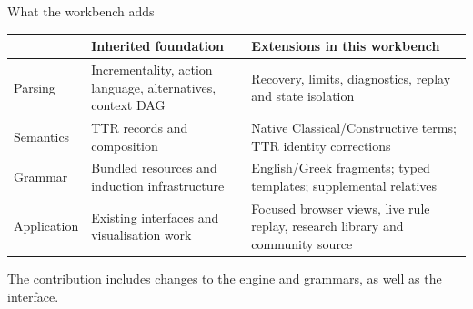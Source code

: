 \documentclass[aspectratio=169,11pt]{beamer}
\newcommand{\aside}[1]{\par{\small\color{Muted}#1}\par}
\begin{document}
\begin{frame}{What the workbench adds}
  \color{Ink}
  \small
  \begin{tabularx}{\textwidth}{@{}p{28mm}YY@{}}\toprule
    & \textbf{Inherited foundation} & \textbf{Extensions in this workbench}\\\midrule
    Parsing & Incrementality, action language, alternatives, context DAG & Recovery, limits, diagnostics, replay and state isolation\\[4pt]
    Semantics & TTR records and composition & Native Classical/Constructive terms; TTR identity corrections\\[4pt]
    Grammar & Bundled resources and induction infrastructure & English/Greek fragments; typed templates; supplemental relatives\\[4pt]
    Application & Existing interfaces and visualisation work & Focused browser views, live rule replay, research library and community source\\\bottomrule
  \end{tabularx}\par
  \vspace{4mm}
  \aside{The contribution includes changes to the engine and grammars, as well as the interface.}
\end{frame}
\end{document}
